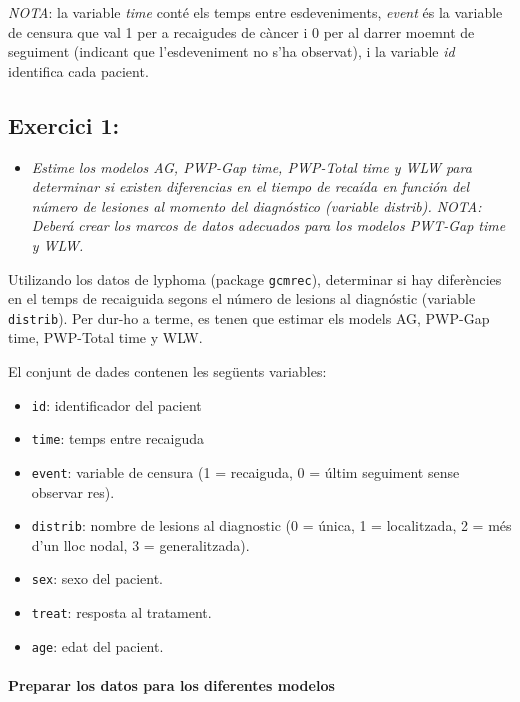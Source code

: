 \documentclass[
]{article}
\providecommand{\tightlist}{%
  \setlength{\itemsep}{0pt}\setlength{\parskip}{0pt}}
\begin{document}
\emph{NOTA}: la variable \emph{time} conté els temps entre
esdeveniments, \emph{event} és la variable de censura que val 1 per a
recaigudes de càncer i 0 per al darrer moemnt de seguiment (indicant que
l'esdeveniment no s'ha observat), i la variable \emph{id} identifica
cada pacient.

\subsection{Exercici 1:}\label{exercici-1}

\begin{itemize}
\tightlist
\item
  \emph{Estime los modelos AG, PWP-Gap time, PWP-Total time y WLW para
  determinar si existen diferencias en el tiempo de recaída en función
  del número de lesiones al momento del diagnóstico (variable distrib).
  NOTA: Deberá crear los marcos de datos adecuados para los modelos
  PWT-Gap time y WLW.}
\end{itemize}

Utilizando los datos de lyphoma (package \texttt{gcmrec}), determinar si
hay diferències en el temps de recaiguida segons el número de lesions al
diagnóstic (variable \texttt{distrib}). Per dur-ho a terme, es tenen que
estimar els models AG, PWP-Gap time, PWP-Total time y WLW.

El conjunt de dades contenen les següents variables:

\begin{itemize}
\tightlist
\item
  \texttt{id}: identificador del pacient
\item
  \texttt{time}: temps entre recaiguda
\item
  \texttt{event}: variable de censura (1 = recaiguda, 0 = últim
  seguiment sense observar res).
\item
  \texttt{distrib}: nombre de lesions al diagnostic (0 = única, 1 =
  localitzada, 2 = més d'un lloc nodal, 3 = generalitzada).
\item
  \texttt{sex}: sexo del pacient.
\item
  \texttt{treat}: resposta al tratament.
\item
  \texttt{age}: edat del pacient.
\end{itemize}

\paragraph{\texorpdfstring{\textbf{Preparar los datos para los
diferentes
modelos}}{Preparar los datos para los diferentes modelos}}\label{preparar-los-datos-para-los-diferentes-modelos}
\end{document}
